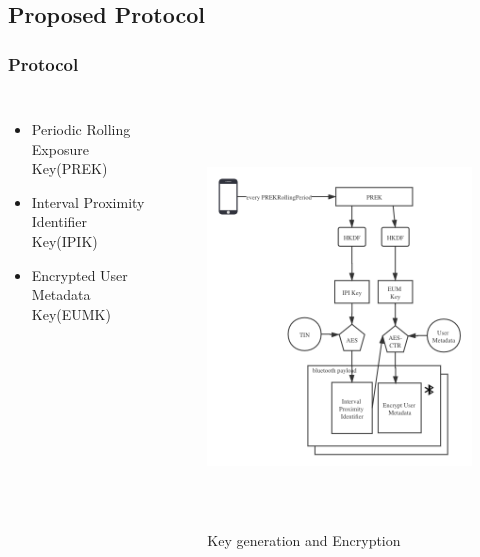 \documentclass{beamer}
\begin{document}
\subsection{Proposed Protocol}
\begin{frame}[allowframebreaks]
  \frametitle{Protocol}
  \begin{columns}[c]
  \begin{itemize}
    \item Periodic Rolling Exposure Key(PREK)
    \item Interval Proximity Identifier Key(IPIK)
    \item Encrypted User Metadata Key(EUMK)
  \end{itemize}
  \begin{figure}[]
    \centering
    \includegraphics[height=1.3\textwidth]{figure/Tracking}
    \caption{Key generation and Encryption}
  \end{figure}
\end{columns}


\end{frame}
\end{document}

